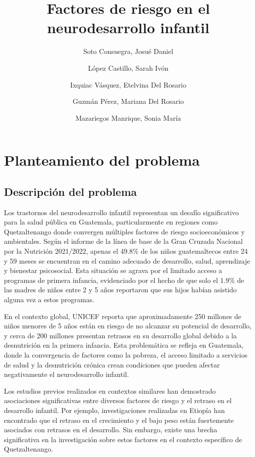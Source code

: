 \documentclass[11pt,letterpaper]{report}
\title{Factores de riesgo en el neurodesarrollo infantil}
\author{Soto Consuegra, Josué Daniel \and López Castillo, Sarah Ivón \and
Ixquiac Vásquez, Etelvina Del Rosario \and Guzmán Pérez, Mariana Del Rosario
\and Mazariegos Manrique, Sonia María}
\begin{document}
	\tableofcontents
	\chapter{Planteamiento del problema}
\section{Descripción del problema}
Los trastornos del neurodesarrollo infantil representan un desafío
significativo para la salud pública en Guatemala, particularmente en regiones
como Quetzaltenango donde convergen múltiples factores de riesgo
socioeconómicos y ambientales. Según el informe de la línea de base de la Gran
Cruzada Nacional por la Nutrición 2021/2022, apenas el 49.8\% de los niños
guatemaltecos entre 24 y 59 meses se encuentran en el camino adecuado de
desarrollo, salud, aprendizaje y bienestar psicosocial. Esta situación se
agrava por el limitado acceso a programas de primera infancia, evidenciado por
el hecho de que solo el 1.9\% de las madres de niños entre 2 y 5 años
reportaron que sus hijos habían asistido alguna vez a estos programas.
\cite{SESAN2022}

En el contexto global, UNICEF reporta que aproximadamente 250 millones de niños
menores de 5 años están en riesgo de no alcanzar su potencial de desarrollo, y
cerca de 200 millones presentan retrasos en su desarrollo global debido a la
desnutrición en la primera infancia. \cite{UNICEF2023} Esta problemática se
refleja en Guatemala, donde la convergencia de factores como la pobreza, el
acceso limitado a servicios de salud y la desnutrición crónica crean
condiciones que pueden afectar negativamente el neurodesarrollo infantil.

Los estudios previos realizados en contextos similares han demostrado
asociaciones significativas entre diversos factores de riesgo y el retraso en
el desarrollo infantil. Por ejemplo, investigaciones realizadas en Etiopía han
encontrado que el retraso en el crecimiento y el bajo peso están fuertemente
asociados con retrasos en el desarrollo. Sin embargo, existe una brecha
significativa en la investigación sobre estos factores en el contexto
específico de Quetzaltenango.
\end{document}
